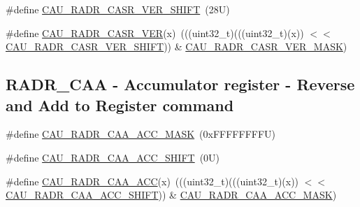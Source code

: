 \begin{DoxyCompactItemize}
\item 
\#define \mbox{\hyperlink{group___c_a_u___register___masks_ga9b9d89d85aab94d1cf9066dcdc9f80b3}{C\+A\+U\+\_\+\+R\+A\+D\+R\+\_\+\+C\+A\+S\+R\+\_\+\+V\+E\+R\+\_\+\+S\+H\+I\+FT}}~(28\+U)
\item 
\#define \mbox{\hyperlink{group___c_a_u___register___masks_gad6072b4fc13d1b80be7ce33a71da8b1f}{C\+A\+U\+\_\+\+R\+A\+D\+R\+\_\+\+C\+A\+S\+R\+\_\+\+V\+ER}}(x)~(((uint32\+\_\+t)(((uint32\+\_\+t)(x)) $<$$<$ \mbox{\hyperlink{group___c_a_u___register___masks_ga9b9d89d85aab94d1cf9066dcdc9f80b3}{C\+A\+U\+\_\+\+R\+A\+D\+R\+\_\+\+C\+A\+S\+R\+\_\+\+V\+E\+R\+\_\+\+S\+H\+I\+FT}})) \& \mbox{\hyperlink{group___c_a_u___register___masks_ga93d73e487a9f7e0f78ff89b8c2162099}{C\+A\+U\+\_\+\+R\+A\+D\+R\+\_\+\+C\+A\+S\+R\+\_\+\+V\+E\+R\+\_\+\+M\+A\+SK}})
\end{DoxyCompactItemize}
\subsection*{R\+A\+D\+R\+\_\+\+C\+AA -\/ Accumulator register -\/ Reverse and Add to Register command}
\begin{DoxyCompactItemize}
\item 
\#define \mbox{\hyperlink{group___c_a_u___register___masks_ga547665f9f7c6125733272bdba9d975f3}{C\+A\+U\+\_\+\+R\+A\+D\+R\+\_\+\+C\+A\+A\+\_\+\+A\+C\+C\+\_\+\+M\+A\+SK}}~(0x\+F\+F\+F\+F\+F\+F\+F\+F\+U)
\item 
\#define \mbox{\hyperlink{group___c_a_u___register___masks_gac2c98d65b03f99b601c30efaec5044f8}{C\+A\+U\+\_\+\+R\+A\+D\+R\+\_\+\+C\+A\+A\+\_\+\+A\+C\+C\+\_\+\+S\+H\+I\+FT}}~(0\+U)
\item 
\#define \mbox{\hyperlink{group___c_a_u___register___masks_ga4b76d84deca84761050fb5501b2e1f90}{C\+A\+U\+\_\+\+R\+A\+D\+R\+\_\+\+C\+A\+A\+\_\+\+A\+CC}}(x)~(((uint32\+\_\+t)(((uint32\+\_\+t)(x)) $<$$<$ \mbox{\hyperlink{group___c_a_u___register___masks_gac2c98d65b03f99b601c30efaec5044f8}{C\+A\+U\+\_\+\+R\+A\+D\+R\+\_\+\+C\+A\+A\+\_\+\+A\+C\+C\+\_\+\+S\+H\+I\+FT}})) \& \mbox{\hyperlink{group___c_a_u___register___masks_ga547665f9f7c6125733272bdba9d975f3}{C\+A\+U\+\_\+\+R\+A\+D\+R\+\_\+\+C\+A\+A\+\_\+\+A\+C\+C\+\_\+\+M\+A\+SK}})
\end{DoxyCompactItemize}
